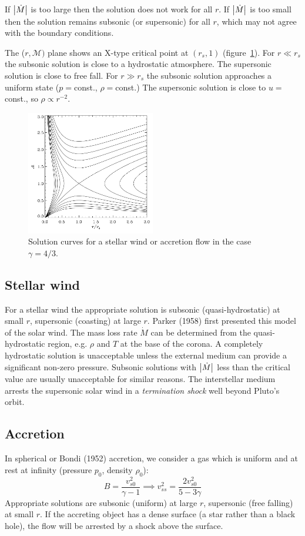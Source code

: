 \documentclass{jknotes}
\newcommand{\M}{\mathcal{M}}
\begin{document}
If $\abs{\dot{M}}$ is too large then the solution does not work for all $r$.
If $\abs{\dot{M}}$ is too small then the solution remains subsonic (or
supersonic) for all $r$, which may not agree with the boundary conditions.

The ($r, \M)$ plane shows an X-type critical point at $(r_s, 1)$
(figure~\ref{fig:stellarwind}). For $r \ll
r_s$ the subsonic solution is close to a hydrostatic atmosphere. The
supersonic solution is close to free fall. For $r \gg r_s$ the subsonic
solution approaches a uniform state ($p = $const., $\rho = $const.) The
supersonic solution is close to $u =$const., so $\rho \propto r^{-2}$.
\begin{figure}[h]
	\centering
	\includegraphics[width=0.5\textwidth]{stellar_plot.png}
	\caption{Solution curves for a stellar wind or accretion flow in the case
	$\gamma = 4/3$.}
	\label{fig:stellarwind}
\end{figure}

\subsection{Stellar wind}
For a stellar wind the appropriate solution is subsonic (quasi-hydrostatic) at
small $r$, supersonic (coasting) at large $r$. Parker (1958) first presented
this model of the solar wind. The mass loss rate $\dot{M}$ can be determined
from the quasi-hydrostatic region, e.g. $\rho$ and $T$ at the base of the
corona. A completely hydrostatic solution is unacceptable unless the external
medium can provide a significant non-zero pressure. Subsonic solutions with
$\abs{\dot{M}}$ less than the critical value are usually unacceptable for
similar reasons. The interstellar medium arrests the supersonic solar wind in
a \emph{termination shock} well beyond Pluto's orbit.

\subsection{Accretion}
In spherical or Bondi (1952) accretion, we consider a gas which is uniform and
at rest at infinity (pressure $p_0$, density $\rho_0$):
\begin{equation}
	B = \frac{v_{s0}^2}{\gamma -1} \implies v_{ss}^2 =
	\frac{2v_{s0}^2}{5-3\gamma}
\end{equation}
Appropriate solutions are subsonic (uniform) at large $r$, supersonic (free
falling) at small $r$. If the accreting object has a dense surface (a star
rather than a black hole), the flow will be arrested by a shock above the
surface. 
\end{document}
